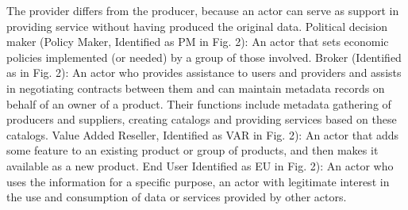 \documentclass[10pt,twocolumn,ieeetran]{article}
\begin{document}
The provider differs from the producer, because an actor can serve as support in providing service without having produced the original data. Political decision maker (Policy Maker, Identified as PM in Fig. 2): An actor that sets economic policies implemented (or needed) by a group of those involved. Broker (Identified as in Fig. 2): An actor who provides assistance to users and providers and assists in negotiating contracts between them and can maintain metadata records on behalf of an owner of a product. Their functions include metadata gathering of producers and suppliers, creating catalogs and providing services based on these catalogs. Value Added Reseller, Identified as VAR in Fig. 2): An actor that adds some feature to an existing product or group of products, and then makes it available as a new product. End User Identified as EU in Fig. 2): An actor who uses the information for a specific purpose, an actor with legitimate interest in the use and consumption of data or services provided by other actors.


\end{document}
